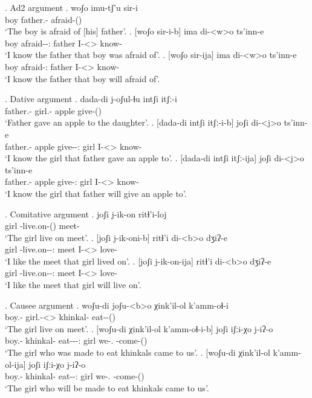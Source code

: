 \ex. Ad2 argument
	\ag. woʃo imu-tʃ'u sir-i\\
			{boy} {father.\Obl-\Ads} {afraid-\Pst(\Aor)}\\
			\glt `The boy is afraid of [his] father'.
	\bg. [woʃo sir-i-b] ima di-<w>o ts'inn-e\\
			{boy} {afraid-\Pst-\Ptcp:\Pst} father {I-<\M>\Aff} {know-\Hab} \\
			\glt `I know the father that boy was afraid of'.
	\bg. [woʃo sir-ija] ima di-<w>o ts'inn-e\\
			{boy} {afraid-\Ptcp:\Pres} father {I-<\M>\Aff} {know-\Hab} \\
			\glt `I know the father that boy will afraid of'.

\ex. Dative argument
	\ag. dada-di j-oʃul-ɬu intʃi itʃː-i\\
			{father.\Obl-\Erg} {girl.\Obl-\Dat} apple {give-\Pst(\Aor)}\\
			\glt `Father gave an apple to the daughter'.
	\bg. [dada-di intʃi itʃː-i-b] joʃi di-<j>o ts'inn-e\\
			{father.\Obl-\Erg} apple {give-\Pst-\Ptcp:\Pst} {girl} {I-<\F>\Aff} {know-\Hab} \\
			\glt `I know the girl that father gave an apple to'.
	\bg. [dada-di intʃi itʃː-ija] joʃi di-<j>o ts'inn-e\\
			{father.\Obl-\Erg} apple {give-\Ptcp:\Pres} {girl} {I-<\F>\Aff} {know-\Hab} \\
			\glt `I know the girl that father will give an apple to'.

\ex. Comitative argument
	\ag. joʃi j-ik-on ritɬ'i-loj\\
			girl {\F-live.on-\Pst(\Aor)} {meet-\Com}\\
			\glt `The girl live on meet'.
	\bg. [joʃi j-ik-oni-b] ritɬ'i di-<b>o dʒiʔ-e\\
			girl {\F-live.on-\Pst-\Ptcp:\Pst} meet {I-<\Nanf>\Aff} {love-\Hab}\\
			\glt `I like the meet that girl lived on'.
	\bg. [joʃi j-ik-on-ija] ritɬ'i di-<b>o dʒiʔ-e\\
			girl {\F-live.on-\Npst-\Ptcp:\Pres} meet {I-<\Nanf>\Aff} {love-\Hab}\\
			\glt `I like the meet that girl will live on'.

\ex. Causee argument
	\ag. woʃu-di joʃu-<b>o χink'il-ol k'amm-oɬ-i\\
			{boy.\Obl-\Erg} {girl.\Obl-<\Nanf>\Aff} {khinkal-\Pl} {eat-\Caus-\Pst(\Aor)}\\
			\glt `The girl live on meet'.
	\bg. [woʃu-di χink'il-ol k'amm-oɬ-i-b] joʃi iʃːi-χo j-iʔ-o\\
			{boy.\Obl-\Erg} {khinkal-\Pl} {eat-\Caus-\Pst-\Ptcp:\Pst} girl {we-\Add.\Lat} {\F-come-\Pst(\Aor)}\\
			\glt `The girl who was made to eat khinkals came to us'.
	\bg. [woʃu-di χink'il-ol k'amm-ol-ija] joʃi iʃːi-χo j-iʔ-o\\
			{boy.\Obl-\Erg} {khinkal-\Pl} {eat-\Caus-\Ptcp:\Pres} girl {we-\Add.\Lat} {\F-come-\Pst(\Aor)}\\
			\glt `The girl who will be made to eat khinkals came to us'.
						
